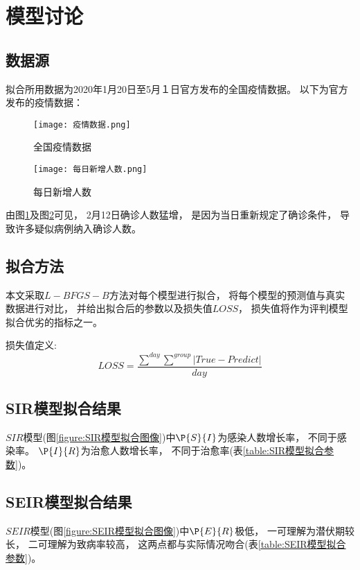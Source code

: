 \section{模型讨论}
\subsection{数据源}
\par 拟合所用数据为2020年1月20日至5月１日官方发布的全国疫情数据。
以下为官方发布的疫情数据：
\begin{figure}[H]
    \centering
    \texttt{[image: 疫情数据.png]}
    \caption{全国疫情数据\label{figure:全国疫情数据}}
\end{figure}
\begin{figure}[H]
    \centering
    \texttt{[image: 每日新增人数.png]}
    \caption{每日新增人数\label{figure:每日新增人数}}
\end{figure}
\par
由图\ref{figure:全国疫情数据}及图\ref{figure:每日新增人数}可见，
2月12日确诊人数猛增，
是因为当日重新规定了确诊条件，
导致许多疑似病例纳入确诊人数。
\subsection{拟合方法}
\par 本文采取$L-BFGS-B$方法对每个模型进行拟合，
将每个模型的预测值与真实数据进行对比，
并给出拟合后的参数以及损失值$LOSS$，
损失值将作为评判模型拟合优劣的指标之一。
\par 损失值定义:
\begin{equation}
    LOSS = \frac{\sum\limits^{day}\sum\limits^{group}
        \left|True-Predict\right|}{day}
\end{equation}
\subsection{SIR模型拟合结果}
\par $SIR$模型(图\ref{figure:SIR模型拟合图像})中$\P{S}{I}$为感染人数增长率，
不同于感染率。
$\P{I}{R}$为治愈人数增长率，
不同于治愈率(表\ref{table:SIR模型拟合参数})。
\subsection{SEIR模型拟合结果}
\par $SEIR$模型(图\ref{figure:SEIR模型拟合图像})中$\P{E}{R}$极低，
一可理解为潜伏期较长，
二可理解为致病率较高，
这两点都与实际情况吻合(表\ref{table:SEIR模型拟合参数})。
